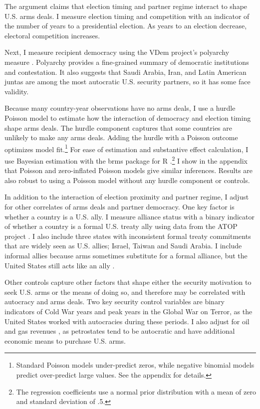 \documentclass[12pt]{article}
\begin{document}
The argument claims that election timing and partner regime interact to shape U.S. arms deals. 
I measure election timing and competition with an indicator of the number of years to a presidential election. 
As years to an election decrease, electoral competition increases. 


Next, I measure recipient democracy using the VDem project's polyarchy measure \citep{Coppedgeetal2008}. 
Polyarchy provides a fine-grained summary of democratic institutions and contestation.
It also suggests that Saudi Arabia, Iran, and Latin American juntas are among the most autocratic U.S. security partners, so it has some face validity.  


Because many country-year observations have no arms deals, I use a hurdle Poisson model to estimate how the interaction of democracy and election timing shape arms deals.
The hurdle component captures that some countries are unlikely to make any arms deals.
Adding the hurdle with a Poisson outcome optimizes model fit.\footnote{Standard Poisson models under-predict zeros, while negative binomial models predict over-predict large values. See the appendix for details.} 
For ease of estimation and substantive effect calculation, I use Bayesian estimation with the brms package for \textsf{R} \citep{Buerkner2017}.\footnote{The regression coefficients use a normal prior distribution with a mean of zero and standard deviation of .5.}
I show in the appendix that Poisson and zero-inflated Poisson models give similar inferences. 
Results are also robust to using a Poisson model without any hurdle component or controls.


In addition to the interaction of election proximity and partner regime, I adjust for other correlates of arms deals and partner democracy. 
One key factor is whether a country is a U.S. ally. 
I measure alliance status with a binary indicator of whether a country is a formal U.S. treaty ally using data from the ATOP project \citep{Leedsetal2002}.
I also include three states with inconsistent formal treaty commitments that are widely seen as U.S. allies; Israel, Taiwan and Saudi Arabia. 
I include informal allies because arms sometimes substitute for a formal alliance, but the United States still acts like an ally \citep{Yarhi-Miloetal2016}. 


Other controls capture other factors that shape either the security motivation to seek U.S. arms or the means of doing so, and therefore may be correlated with autocracy and arms deals. 
Two key security control variables are binary indicators of Cold War years and peak years in the Global War on Terror, as the United States worked with autocracies during these periods. 
I also adjust for oil and gas revenues \citep{RossMahdavi2015}, as petrostates tend to be autocratic and have additional economic means to purchase U.S. arms.
\end{document}
